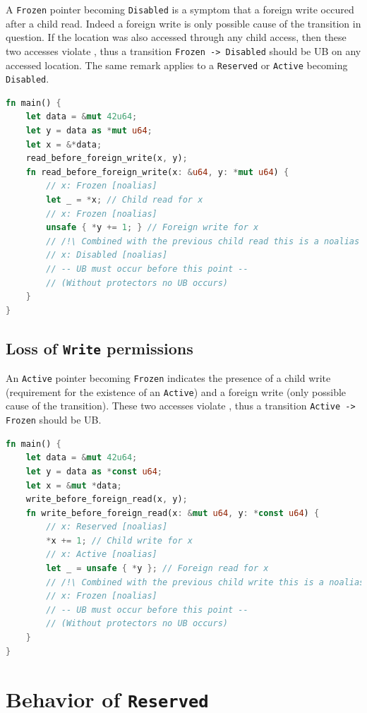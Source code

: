\documentclass[a4paper,11pt]{article}
\theoremstyle{plain}
\theoremstyle{definition}
\theoremstyle{remark}
\newcommand{\tcode}[1]{\rstinline{#1}}
\newcommand{\tperm}[1]{\texttt{#1}}
\begin{document}
A \tperm{Frozen} pointer becoming \tperm{Disabled} is a symptom that a foreign write occured after
a child read. Indeed a foreign write is only possible cause of the transition in question.
If the location was also accessed through any child access, then these two accesses violate
\tcode{noalias}, thus a transition \tperm{Frozen -> Disabled} should be UB on any accessed location.
The same remark applies to a \tperm{Reserved} or \tperm{Active} becoming \tperm{Disabled}.

\begin{lstlisting}[language=rust]
fn main() {
    let data = &mut 42u64;
    let y = data as *mut u64;
    let x = &*data;
    read_before_foreign_write(x, y);
    fn read_before_foreign_write(x: &u64, y: *mut u64) {
        // x: Frozen [noalias]
        let _ = *x; // Child read for x
        // x: Frozen [noalias]
        unsafe { *y += 1; } // Foreign write for x
        // /!\ Combined with the previous child read this is a noalias violation
        // x: Disabled [noalias]
        // -- UB must occur before this point --
        // (Without protectors no UB occurs)
    }
}
\end{lstlisting}


\subsection{Loss of \tperm{Write} permissions}

An \tperm{Active} pointer becoming \tperm{Frozen} indicates the presence of a child write
(requirement for the existence of an \tperm{Active}) and a foreign write (only possible cause
of the transition). These two accesses violate \tcode{noalias}, thus a transition \tperm{Active -> Frozen}
should be UB.

\begin{lstlisting}[language=rust]
fn main() {
    let data = &mut 42u64;
    let y = data as *const u64;
    let x = &mut *data;
    write_before_foreign_read(x, y);
    fn write_before_foreign_read(x: &mut u64, y: *const u64) {
        // x: Reserved [noalias]
        *x += 1; // Child write for x
        // x: Active [noalias]
        let _ = unsafe { *y }; // Foreign read for x
        // /!\ Combined with the previous child write this is a noalias violation
        // x: Frozen [noalias]
        // -- UB must occur before this point --
        // (Without protectors no UB occurs)
    }
}
\end{lstlisting}

\newpage
\section{Behavior of \tperm{Reserved}}
\label{app:reserved}
\end{document}
